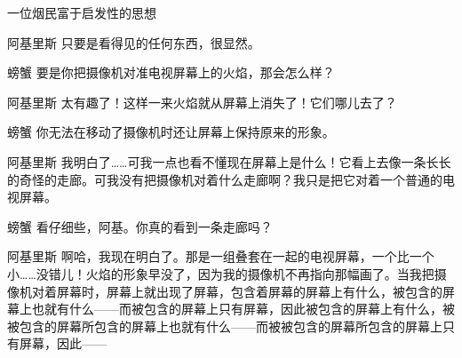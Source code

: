 \begin{dialog}{一位烟民富于启发性的思想}
\begin{dialogue}
\item[阿基里斯]只要是看得见的任何东西，很显然。

\item[螃蟹]要是你把摄像机对准电视屏幕上的火焰，那会怎么样？


\item[阿基里斯]太有趣了！这样一来火焰就从屏幕上消失了！它们哪儿去了？

\item[螃蟹]你无法在移动了摄像机时还让屏幕上保持原来的形象。

\item[阿基里斯]我明白了……可我一点也看不懂现在屏幕上是什么！它看上去像一条长长的奇怪的走廊。可我没有把摄像机对着什么走廊啊？我只是把它对着一个普通的电视屏幕。

\item[螃蟹]看仔细些，阿基。你真的看到一条走廊吗？

\item[阿基里斯]啊哈，我现在明白了。那是一组叠套在一起的电视屏幕，一个比一个小……没错儿！火焰的形象早没了，因为我的摄像机不再指向那幅画了。当我把摄像机对着屏幕时，屏幕上就出现了屏幕，包含着屏幕的屏幕上有什么，被包含的屏幕上也就有什么——而被包含的屏幕上只有屏幕，因此被包含的屏幕上有什么，被被包含的屏幕所包含的屏幕上也就有什么——而被被包含的屏幕所包含的屏幕上只有屏幕，因此——


\end{dialogue}
\end{dialog}
